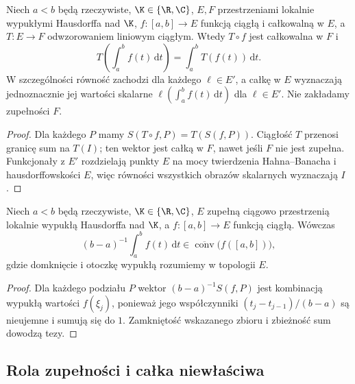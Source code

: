 \begin{twierdzenie}
\label{thm:riemann-functorial15a}
Niech $a<b$ będą rzeczywiste, $\K\in\{\R,\C\}$,
$E,F$ przestrzeniami lokalnie wypukłymi Hausdorffa nad $\K$,
$f:[a,b]\to E$ funkcją ciągłą i całkowalną w $E$, a
$T:E\to F$ odwzorowaniem liniowym ciągłym. Wtedy $T\circ f$
jest całkowalna w $F$ i
\[
 T\left(\int_a^b f(t)\,\mathrm dt\right)
 =\int_a^b T(f(t))\,\mathrm dt.
\]
W szczególności równość zachodzi dla każdego $\ell\in E'$, a
całkę w $E$ wyznaczają jednoznacznie jej wartości skalarne
$\ell(\int_a^b f(t)\,\mathrm dt)$ dla $\ell\in E'$.
Nie zakładamy zupełności $F$.
\end{twierdzenie}
\begin{proof}
Dla każdego $P$ mamy $S(T\circ f,P)=T(S(f,P))$.
Ciągłość $T$ przenosi granicę sum na $T(I)$; ten wektor jest
całką w $F$, nawet jeśli $F$ nie jest zupełna.
Funkcjonały z $E'$ rozdzielają punkty $E$ na mocy
twierdzenia Hahna--Banacha i hausdorffowskości $E$,
więc równości wszystkich obrazów skalarnych wyznaczają $I$.
\end{proof}

\begin{wniosek}
\label{cor:barycenter15a}
Niech $a<b$ będą rzeczywiste, $\K\in\{\R,\C\}$,
$E$ zupełną ciągowo przestrzenią lokalnie wypukłą Hausdorffa
nad $\K$, a $f:[a,b]\to E$ funkcją ciągłą. Wówczas
\[
 (b-a)^{-1}\int_a^b f(t)\,\mathrm dt
 \in\overline{\operatorname{conv}}\bigl(f([a,b])\bigr),
\]
gdzie domknięcie i otoczkę wypukłą rozumiemy w topologii $E$.
\end{wniosek}
\begin{proof}
Dla każdego podziału $P$ wektor $(b-a)^{-1}S(f,P)$ jest
kombinacją wypukłą wartości $f(\xi_j)$, ponieważ jego
współczynniki $(t_j-t_{j-1})/(b-a)$ są nieujemne i sumują się do $1$.
Zamkniętość wskazanego zbioru i zbieżność sum dowodzą tezy.
\end{proof}

\subsection{Rola zupełności i całka niewłaściwa}

